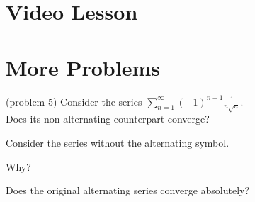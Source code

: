 \documentclass[handout]{ximera}
\begin{document}
\section{Video Lesson}




\begin{center}
\begin{foldable}
\end{foldable}
\end{center}


\section{More Problems}



\begin{problem}(problem 5)
Consider the series $\displaystyle{\sum_{n=1}^\infty (-1)^{n+1} \frac{1}{n\sqrt n}}$.\\
Does its non-alternating counterpart converge?
\begin{hint} 
Consider the series without the alternating symbol.
\end{hint}
\begin{multipleChoice}
\end{multipleChoice}

Why?
\begin{multipleChoice}
\end{multipleChoice}


Does the original alternating series converge absolutely?
\begin{multipleChoice}
\end{multipleChoice}

\end{problem}
\end{document}
